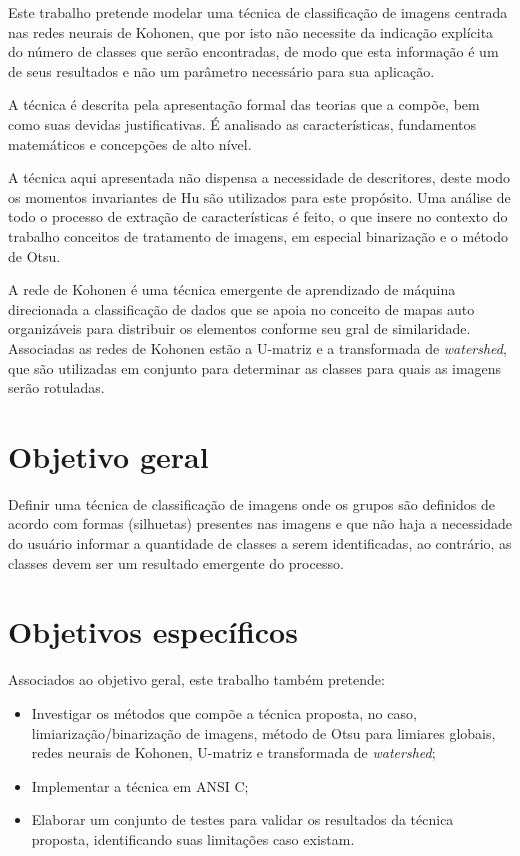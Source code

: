 Este trabalho pretende modelar uma técnica de classificação de imagens centrada
nas redes neurais de Kohonen, que por isto não necessite da indicação explícita
do número de classes que serão encontradas, de modo que esta informação é um de
seus resultados e não um parâmetro necessário para sua aplicação.

A técnica é descrita pela apresentação formal das teorias que a compõe, bem
como suas devidas justificativas. É analisado as características, fundamentos
matemáticos e concepções de alto nível.

A técnica aqui apresentada não dispensa a necessidade de descritores, deste modo
os momentos invariantes de Hu são utilizados para este propósito. Uma análise de
todo o processo de extração de características é feito, o que
insere no contexto do trabalho conceitos de tratamento de imagens, em especial
binarização e o método de Otsu.

A rede de Kohonen é uma técnica emergente de aprendizado de máquina
direcionada a classificação de dados que se apoia no conceito
de mapas auto organizáveis para distribuir os elementos conforme seu gral de
similaridade. Associadas as redes de Kohonen estão a U-matriz e a transformada
de \textit{watershed}, que são utilizadas em conjunto para determinar as classes
para quais as imagens serão rotuladas.

\section{Objetivo geral}

Definir uma técnica de classificação de imagens onde os grupos são definidos de
acordo com formas (silhuetas) presentes nas imagens e que não haja a necessidade
do usuário informar a quantidade de classes a serem identificadas, ao contrário,
as classes devem ser um resultado emergente do processo.

\section{Objetivos específicos}

Associados ao objetivo geral, este trabalho também pretende:

\begin{itemize}

\item Investigar os métodos que compõe a técnica proposta, no caso,
  limiarização/binarização de imagens, método de Otsu para limiares globais, redes
  neurais de Kohonen, U-matriz e transformada de \textit{watershed};

\item Implementar a técnica em ANSI C;

\item Elaborar um conjunto de testes para validar os resultados da técnica
  proposta, identificando suas limitações caso existam.

\end{itemize}

